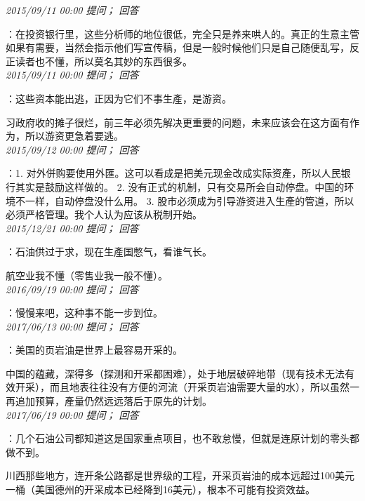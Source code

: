 \documentclass[twocolumn]{ctexart}
\begin{document}
\textit{\hfill\noindent\small 2015/09/11 00:00 提问； 回答}

：在投资银行里，这些分析师的地位很低，完全只是养来哄人的。真正的生意主管如果有需要，当然会指示他们写宣传稿，但是一般时候他们只是自己随便乱写，反正读者也不懂，所以莫名其妙的东西很多。\\

\textit{\hfill\noindent\small 2015/09/11 00:00 提问； 回答}

：这些资本能出逃，正因为它们不事生產，是游资。

习政府收的摊子很烂，前三年必须先解决更重要的问题，未来应该会在这方面有作为，所以游资更急着要逃。\\

\textit{\hfill\noindent\small 2015/09/12 00:00 提问； 回答}

：1. 对外併购要使用外匯。这可以看成是把美元现金改成实际资產，所以人民银行其实是鼓励这样做的。
2. 没有正式的机制，只有交易所会自动停盘。中国的环境不一样，自动停盘没什么用。
3. 股市必须成为引导游资进入生產的管道，所以必须严格管理。我个人认为应该从税制开始。\\

\textit{\hfill\noindent\small 2015/12/21 00:00 提问； 回答}

：石油供过于求，现在生產国憋气，看谁气长。

航空业我不懂（零售业我一般不懂）。\\

\textit{\hfill\noindent\small 2016/09/19 00:00 提问； 回答}

：慢慢来吧，这种事不能一步到位。\\

\textit{\hfill\noindent\small 2017/06/13 00:00 提问； 回答}

：美国的页岩油是世界上最容易开采的。

中国的蕴藏，深得多（探测和开采都困难），处于地层破碎地带（现有技术无法有效开采），而且地表往往没有方便的河流（开采页岩油需要大量的水），所以虽然一再追加预算，產量仍然远远落后于原先的计划。\\

\textit{\hfill\noindent\small 2017/06/19 00:00 提问； 回答}

：几个石油公司都知道这是国家重点项目，也不敢怠慢，但就是连原计划的零头都做不到。

川西那些地方，连开条公路都是世界级的工程，开采页岩油的成本远超过100美元一桶（美国德州的开采成本已经降到16美元），根本不可能有投资效益。\\
\end{document}

